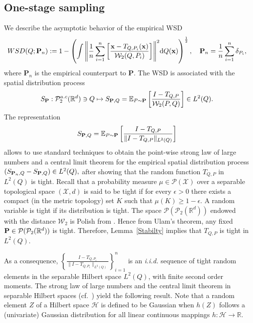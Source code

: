 \documentclass{imsart}
\numberwithin{equation}{section}
\def\R{\mathbb{R}}
\def\E{\mathbb{E}}
\def\x{\mathbf{x}}
\def\E{\mathbb E}
\def\x{\mathbf x}
\begin{document}
\subsection{One-stage sampling}\label{one_stg_sampling}
We describe the asymptotic behavior of the empirical WSD 
\begin{equation}\label{one-stage-sampling}
	{\rm WSD}(Q; {\bf P}_n):=1-  \left(\int{ \left\|\frac{1}{n}\sum_{i=1}^n \left[  \frac{\x-T_{Q,P_i}(\x) }{\mathcal{W}_2(Q, P_i)}\right]\right\|^2} \mathrm{d}Q(\x)\right)^{\frac{1}{2}}, \quad {\bf P}_n =\frac{1}{n}\sum_{i=1}^n \delta_{P_i} ,
\end{equation}
where $\mathbf{P}_n$ is the empirical counterpart to $\mathbf{P}$.  
The WSD is associated with the spatial distribution process 
$$ S_{{\bf P}}:  \mathcal{P}^{a.c}_2(\R^d)\ni Q \mapsto S_{{\bf P},Q}=\E_{P\sim \mathbf{P}}\left[  \frac{I-T_{Q,P} }{\mathcal{W}_2(P,Q)}\right] \in L^2(Q).$$
The representation 
$$ S_{{\bf P},Q} =\E_{P\sim \mathbf{P}}\left[  \frac{I-T_{Q,P} }{\|I-T_{Q,P}\|_{L^2(Q)}}\right]  $$
allows to use 
standard techniques to obtain the point-wise  strong law of large numbers and a central limit theorem for
the empirical spatial distribution process
$\left(S_{{\bf P}_n,Q }-S_{{\bf P},Q} \right) \in L^2(Q),  $
after showing that the random function $T_{Q,P} $ in $L^2(Q)$ is tight.
Recall that a probability measure  $\mu\in \mathcal{P}(\mathcal{X})$ over a separable topological space $(\mathcal{X},d)$  is said to be tight if for every $\epsilon>0$ there exists a compact (in the metric topology) set $K$  such that $\mu(K)\geq 1-\epsilon.$  A random variable is tight if its distribution is tight.     
The space $\mathcal{P}(\mathcal{P}_{2}(\R^d))$
endowed with the distance
$\mathcal{W}_2$
is Polish from \cite[Proposition 7.1.5]{AmbrosioGradient}.
Hence from Ulam's theorem, any
fixed ${\bf P}\in \mathcal{P}(\mathcal{P}_{2}(\R^d))$ is tight.
Therefore, Lemma~\ref{Stabilty} implies that $T_{Q,P}$ is tight in  $L^2(Q)$.  

As a consequence, $\left\{\frac{I-T_{Q,P_i} }{\|I-T_{Q,P_i}\|_{L^2(Q)}}\right\}_{i=1}^n$ is an \textit{i.i.d.} sequence of tight random elements in the separable Hilbert space $L^2(Q)$, with finite second order moments.  The strong law of large numbers and the central limit theorem in separable Hilbert spaces (cf.\ \cite[Corollary~10.9]{Ledoux1991}) yield the following result. 
Note that a random element $Z$ of a Hilbert space $\mathcal{H}$ is defined to be Gaussian when $h(Z)$ follows a (univariate) Gaussian distribution for all linear continuous mappings $h : \mathcal{H} \to \mathbb{R}$. 
\end{document}

